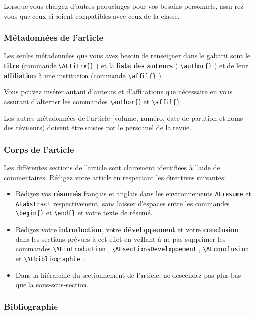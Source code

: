 \documentclass[french]{article}
\newcommand{\cmd}[1]{%
	\texttt{\textbackslash#1\{\}}
}
\newcommand{\dec}[1]{%
	\texttt{\textbackslash#1}
}
\begin{document}
				Lorsque vous chargez d'autres paquetages pour vos besoins personnels, assu-rez-vous que ceux-ci soient
				compatibles avec ceux de la classe.
				
			\subsubsection{Métadonnées de l'article}
			
				Les seules métadonnées que vous avez besoin de renseigner dans le gabarit sont le \textbf{titre} (commande
				\cmd{AEtitre}) et la \textbf{liste des auteurs} (\cmd{author}) et de leur \textbf{affiliation} à une institution (commande
				\cmd{affil}).
				
				Vous pouvez insérer autant d'auteurs et d'affiliations que nécessaire en vous assurant d'alterner les
				commandes \cmd{author} et \cmd{affil}.
				
				Les autres métadonnées de l'article (volume, numéro, date de parution et noms des réviseurs) doivent
				être saisies par le personnel de la revue.
				
			\subsubsection{Corps de l'article}
			
				Les différentes sections de l'article sont clairement identifiées à l'aide de commentaires. Rédigez
				votre article en respectant les directives suivantes:
				
				\begin{itemize}
					\item Rédigez vos \textbf{résumés}  français et anglais dans les environnements \texttt{AEresume} et
						\texttt{AEabstract} respectivement, sans laisser d'espaces entre les commandes \cmd{begin} et 
						\cmd{end} et votre texte de résumé.
					\item Rédigez votre \textbf{introduction}, votre \textbf{développement} et votre \textbf{conclusion} dans les sections prévues
						à cet effet en veillant à ne pas supprimer les commandes \dec{AEintroduction},
						\dec{AEsectionsDeveloppement}, \dec{AEconclusion} et \dec{AEbibliographie}.
					\item Dans la hiérarchie du sectionnement de l'article, ne descendez pas plus bas que la sous-sous-section.
				\end{itemize}
			
			\subsubsection{Bibliographie}
			
\end{document}
